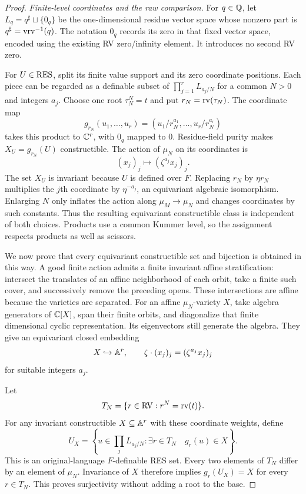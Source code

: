 \begin{proof}
\emph{Finite-level coordinates and the raw comparison.}
For $q\in\mathbb Q$, let $L_q=q^\sharp\sqcup\{0_q\}$ be the
one-dimensional residue vector space whose nonzero part is
$q^\sharp=\operatorname{vrv}^{-1}(q)$. The notation $0_q$ records its zero
in that fixed vector space, encoded using the existing RV
zero/infinity element. It introduces no second RV zero.

For $U\in\mathrm{RES}$, split its finite value support and its zero
coordinate positions. Each piece can be regarded as a definable
subset of $\prod_{j=1}^r L_{a_j/N}$ for a common $N>0$ and
integers $a_j$. Choose one root $\tau_N^N=t$ and put
$r_N=\operatorname{rv}(\tau_N)$. The coordinate map
\[
 g_{r_N}(u_1,\ldots,u_r)
   =(u_1/r_N^{a_1},\ldots,u_r/r_N^{a_r})
\]
takes this product to $\mathbb C^r$, with $0_q$ mapped to $0$.
Residue-field purity makes $X_U=g_{r_N}(U)$ constructible.
The action of $\mu_N$ on its coordinates is
\[
 (x_j)_j\longmapsto(\zeta^{a_j}x_j)_j .
\]
The set $X_U$ is invariant because $U$ is defined over $F$.
Replacing $r_N$ by $\eta r_N$ multiplies the $j$th coordinate
by $\eta^{-a_j}$, an equivariant algebraic isomorphism.
Enlarging $N$ only inflates the action along
$\mu_M\to\mu_N$ and changes coordinates by such constants.
Thus the resulting equivariant constructible class is independent
of both choices. Products use a common Kummer level, so the
assignment respects products as well as scissors.

We now prove that every equivariant constructible set and
bijection is obtained in this way. A good finite action admits a
finite invariant affine stratification: intersect the translates
of an affine neighborhood of each orbit, take a finite such
cover, and successively remove the preceding opens. These
intersections are affine because the varieties are separated.
For an affine $\mu_N$-variety $X$, take algebra generators of
$\mathbb C[X]$, span their finite orbits, and diagonalize that finite
dimensional cyclic representation. Its eigenvectors still
generate the algebra. They give an equivariant closed embedding
\[
 X\hookrightarrow\mathbb A^r,\qquad
 \zeta\cdot(x_j)_j=(\zeta^{a_j}x_j)_j
\]
for suitable integers $a_j$.

Let
\[
 T_N=\{r\in\mathrm{RV}:r^N=\operatorname{rv}(t)\}.
\]
For any invariant constructible
$X\subseteq\mathbb A^r$ with these coordinate weights, define
\[
 U_X=\left\{u\in\prod_jL_{a_j/N}:
       \exists r\in T_N\quad g_r(u)\in X\right\}.
\]
This is an original-language $F$-definable RES set.
Every two elements of $T_N$ differ by an element of $\mu_N$.
Invariance of $X$ therefore implies
$g_r(U_X)=X$ for every $r\in T_N$.
This proves surjectivity without adding a root to the base.


\end{proof}

